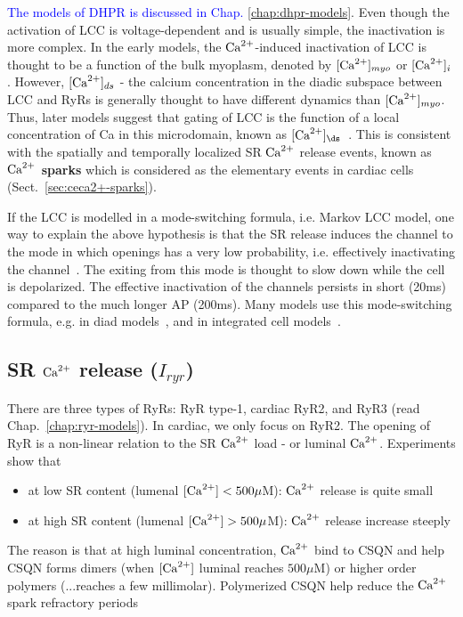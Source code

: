 \textcolor{blue}{The models of DHPR is discussed in
  Chap. \ref{chap:dhpr-models}}.
Even though the activation of LCC is voltage-dependent and is usually simple,
the inactivation is more complex. In the early models, the $\Ca$-induced
inactivation of LCC is thought to be a function of the bulk myoplasm, denoted by
$[\ce{Ca^2+}]_{myo}$ or $[\ce{Ca^2+}]_i$ \citep{difrancesco1985mcea,
luo1994dmc_a, nordin1993cmm}. However, $[\ce{Ca^2+}]_{ds}$ - the calcium
concentration in the diadic subspace between LCC and RyRs is generally thought
to have different dynamics than $[\ce{Ca^2+}]_{myo}$. Thus, later models suggest
that gating of LCC is the function of a local concentration of Ca in this
microdomain, known as $[\Ca]_\ds$~\citep{imredy1992scd, shannon2000pfs}. This is
consistent with the spatially and temporally localized SR $\Ca$ release events,
known as {\bf $\Ca$ sparks} which is considered as the elementary events in
cardiac cells (Sect.~\ref{sec:ceca2+-sparks}).

If the LCC is modelled in a mode-switching formula, i.e. Markov LCC
model, one way to explain the above hypothesis is that the SR release
induces the channel to the mode in which openings has a very low
probability, i.e. effectively inactivating the
channel~\citep{imredy1994mcs}. The exiting from this mode is thought to
slow down while the cell is depolarized. The effective inactivation of
the channels persists in short (20ms) compared to the much longer AP
(200ms). Many models use this mode-switching formula, e.g. in diad
models~\citep{rice1999mgg, stern1999lcm}, and in integrated cell
models~\citep{jafri1998cad, rice1999mst,winslow1999,greenstein2002}.


\subsection[SR $\Ca$ release]{SR $\Ca$ release ($I_{ryr}$)}
\label{sec:sr-release}

There are three types of RyRs: RyR type-1, cardiac RyR2, and RyR3
(read Chap.~\ref{chap:ryr-models}). In cardiac, we only focus on RyR2.
The opening of RyR is a non-linear relation to the SR $\Ca$ load
- or luminal $\Ca$. Experiments show
that~\citep{bassani1995fsr,shannon2000pfs}
\begin{itemize}
\item at low SR content (lumenal $[\ce{Ca^2+}] < 500\mu$M): $\Ca$
  release is quite small

\item at high SR content (lumenal $[\ce{Ca^2+}] > 500\mu$M):
  $\Ca$ release increase steeply
\end{itemize}
The reason is that at high luminal concentration, $\Ca$ bind to
CSQN and help CSQN forms dimers (when $[\ce{Ca^2+}]$ luminal reaches
$500\mu$M) or higher order polymers (...reaches a few millimolar).
Polymerized CSQN help reduce the $\Ca$ spark refractory periods

